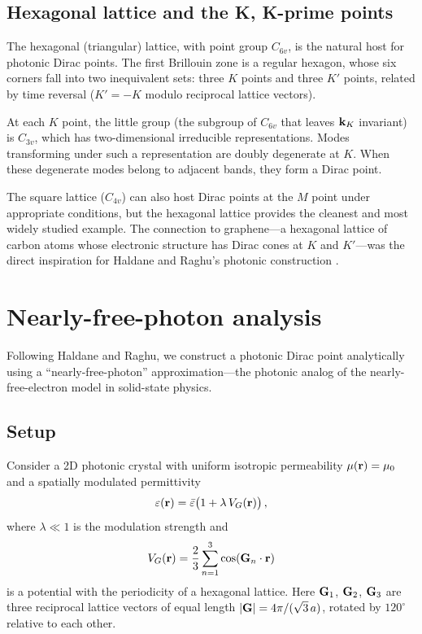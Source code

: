 \subsection{Hexagonal lattice and the K, K-prime points}
\label{sec:ch6-hexagonal}

The hexagonal (triangular) lattice, with point group $C_{6v}$, is the
natural host for photonic Dirac points.  The first Brillouin zone is a
regular hexagon, whose six corners fall into two inequivalent sets:
three $K$ points and three $K'$ points, related by time reversal
($K'=-K$ modulo reciprocal lattice vectors).

At each $K$ point, the little group (the subgroup of $C_{6v}$ that
leaves $\mathbf{k}_K$ invariant) is $C_{3v}$, which has two-dimensional
irreducible representations.  Modes transforming under such a
representation are doubly degenerate at $K$.  When these degenerate
modes belong to adjacent bands, they form a Dirac point.

\begin{remark}
  The square lattice ($C_{4v}$) can also host Dirac points at the $M$
  point under appropriate conditions, but the hexagonal lattice provides
  the cleanest and most widely studied example.  The connection to
  graphene---a hexagonal lattice of carbon atoms whose electronic
  structure has Dirac cones at $K$ and $K'$---was the direct inspiration
  for Haldane and Raghu's photonic construction \cite{haldane2008possible,plotnik2011experimental}.
\end{remark}

\section{Nearly-free-photon analysis}
\label{sec:ch6-nfp}

Following Haldane and Raghu, we construct a photonic Dirac point
analytically using a ``nearly-free-photon'' approximation---the photonic
analog of the nearly-free-electron model in solid-state physics.

\subsection{Setup}
\label{sec:ch6-nfp-setup}

Consider a 2D photonic crystal with uniform isotropic permeability
$\mu(\mathbf{r})=\mu_0$ and a spatially modulated permittivity
\begin{equation}\label{eq:ch6-eps-modulated}
  \varepsilon(\mathbf{r}) = \bar\varepsilon\bigl(1+\lambda\,V_G(\mathbf{r})\bigr)\,,
\end{equation}
where $\lambda\ll 1$ is the modulation strength and
\begin{equation}\label{eq:ch6-VG}
  V_G(\mathbf{r}) = \frac{2}{3}\sum_{n=1}^{3}\cos(\mathbf{G}_n\cdot\mathbf{r})
\end{equation}
is a potential with the periodicity of a hexagonal lattice.  Here
$\mathbf{G}_1$, $\mathbf{G}_2$, $\mathbf{G}_3$ are three reciprocal lattice vectors
of equal length $|\mathbf{G}|=4\pi/(\sqrt{3}\,a)$, rotated by $120^\circ$
relative to each other.

